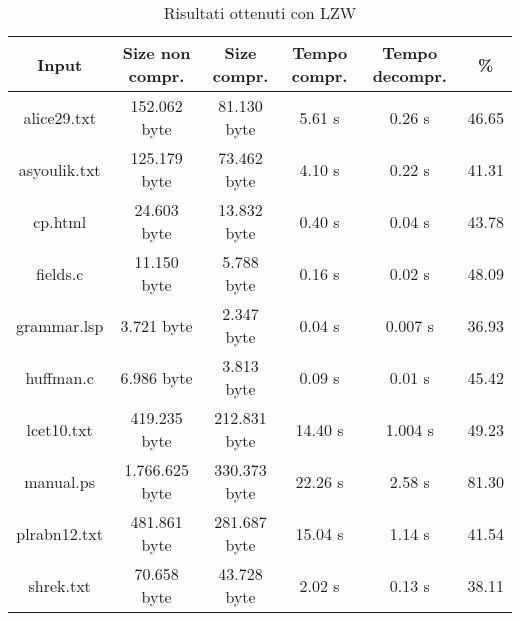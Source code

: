 \begin{table}
    \begin{tabular}{||c c c c c c||} 
     \hline
     Input & Size non compr. & Size compr. & Tempo compr. & Tempo decompr. & \% \\ [0.5ex] 
     \hline\hline
     alice29.txt & 152.062 byte & 81.130 byte & 5.61 s & 0.26 s & 46.65\\ [1ex]
     \hline
     asyoulik.txt & 125.179 byte & 73.462 byte & 4.10 s & 0.22 s & 41.31\\ [1ex] 
     \hline
     cp.html & 24.603 byte & 13.832 byte & 0.40 s & 0.04 s & 43.78\\ [1ex] 
     \hline
     fields.c & 11.150 byte & 5.788 byte & 0.16 s & 0.02 s & 48.09\\ [1ex]
     \hline
     grammar.lsp & 3.721 byte & 2.347 byte & 0.04 s & 0.007 s & 36.93\\ [1ex] 
     \hline
     huffman.c & 6.986 byte & 3.813 byte & 0.09 s & 0.01 s & 45.42\\ [1ex]
     \hline
     lcet10.txt & 419.235 byte & 212.831 byte & 14.40 s & 1.004 s & 49.23\\ [1ex] 
     \hline
     manual.ps & 1.766.625 byte & 330.373 byte & 22.26 s & 2.58 s & 81.30\\ 
 [1ex]
     \hline
     plrabn12.txt & 481.861 byte & 281.687 byte & 15.04 s & 1.14 s & 41.54\\ [1ex] 
     \hline
     shrek.txt & 70.658 byte & 43.728 byte & 2.02 s & 0.13 s & 38.11\\ [1ex]

     \hline
    \end{tabular} 
    \caption{Risultati ottenuti con LZW\label{tab:lzw}}
    \end{table}

